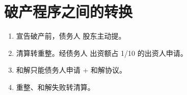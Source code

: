 \section{破产程序之间的转换}
\begin{enumerate}
  \item 宣告破产前，债务人 \hz 股东主动提。
  \item 清算转重整。经债务人 \hz 出资额占 1/10 的出资人申请。
  \item 和解只能债务人申请 + 和解协议。
  \item 重整、和解失败转清算。
\end{enumerate}


